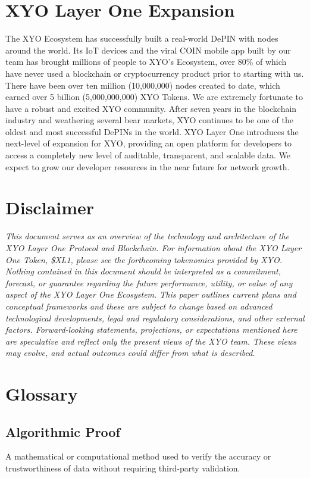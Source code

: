 \documentclass{article}
\begin{document}
\section{XYO Layer One Expansion}
The XYO Ecosystem has successfully built a real-world DePIN with nodes around
the world. Its IoT devices and the viral COIN mobile app built by our team has
brought millions of people to XYO's Ecosystem, over 80\% of which have never
used a blockchain or cryptocurrency product prior to starting with us. There
have been over ten million (10,000,000) nodes created to date, which earned
over 5 billion (5,000,000,000) XYO Tokens. We are extremely fortunate to have a
robust and excited XYO community. After seven years in the blockchain industry
and weathering several bear markets, XYO continues to be one of the oldest and
most successful DePINs in the world. XYO Layer One introduces the next-level of
expansion for XYO, providing an open platform for developers to access a
completely new level of auditable, transparent, and scalable data. We expect to
grow our developer resources in the near future for network growth.

\newpage
\section*{Disclaimer}
\textit{This document serves as an overview of the technology and architecture of the XYO Layer One Protocol and Blockchain. For information about the XYO Layer One Token, \$XL1, please see the forthcoming tokenomics provided by XYO.
    Nothing contained in this document should be interpreted as a commitment, forecast, or guarantee regarding the future performance, utility, or value of any aspect of the XYO Layer One Ecosystem. This paper outlines current plans and conceptual frameworks and these are subject to change based on advanced technological developments, legal and regulatory considerations, and other external factors. Forward-looking statements, projections, or expectations mentioned here are speculative and reflect only the present views of the XYO team. These views may evolve, and actual outcomes could differ from what is described.}

\newpage

\section*{Glossary}

\subsection*{Algorithmic Proof}
A mathematical or computational method used to verify the accuracy or
trustworthiness of data without requiring third-party validation.
\end{document}
